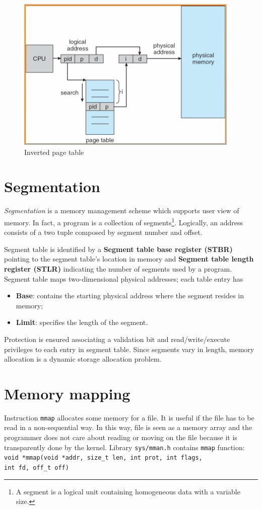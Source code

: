 \begin{figure}[hbtp]
\centering
\includegraphics[scale=0.4]{images/memory_management/inverted_pagetable.jpg}
\caption{Inverted page table}
\end{figure}

\section{Segmentation}
\emph{Segmentation} is a memory management scheme which supports user view of memory. In fact, a program is a collection of segments\footnote{A segment is a logical unit containing homogeneous data with a variable size.}. Logically, an address consists of a two tuple composed by segment number and offset.

Segment table is identified by a \textbf{Segment table base register (STBR)}  pointing to the segment table's location in memory and \textbf{Segment table length register (STLR)} indicating the number of segments used by a program. Segment table maps two-dimensional physical addresses; each table entry has
\begin{itemize}
\item \textbf{Base}: contains the starting physical address where the segment resides in memory;
\item \textbf{Limit}: specifies the length of the segment.
\end{itemize}

Protection is ensured associating a validation bit and read/write/execute privileges to each entry in segment table. Since segments vary in length, memory allocation is a dynamic storage allocation problem.

\section*{Memory mapping}
Instruction \texttt{mmap} allocates some memory for a file. It is useful if the file has to be read in a non-sequential way. In this way, file is seen as a memory array and the programmer does not care about reading or moving on the file because it is transparently done by the kernel.
Library \texttt{sys/mman.h} contains \texttt{mmap} function:
\newline
\texttt{void *mmap(void *addr, size\_t len, int prot, int flags, \\ int fd, off\_t off)}


